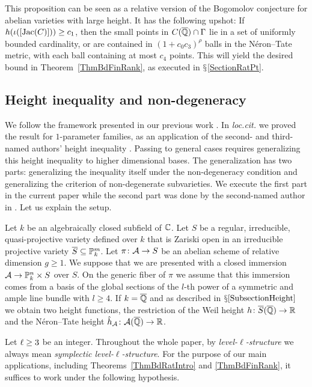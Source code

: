 This proposition can be seen as a relative version of the Bogomolov
conjecture for abelian varieties with large height. It has the
following upshot: If $h(\iota([\mathrm{Jac}(C)])) \ge c_1$, then the small
points in $C(\overline {{\mathbb{Q}}}) \cap \Gamma$ lie in a set of uniformly
bounded cardinality, or are contained in $(1+c_0c_3)^\rho$ balls in the
N\'eron--Tate metric, with each ball containing at most $c_4$ points.
This will yield the desired bound in Theorem~\ref{ThmBdFinRank}, as
executed in $\mathsection$\ref{SectionRatPt}.

\subsection{Height inequality and non-degeneracy}\label{subsec:hgtineqnondeg}
We follow the framework presented in our previous work \cite{DGH1p}.
In \textit{loc.cit.} we proved the result for $1$-parameter families,
as an application of the second- and third-named authors' height
inequality \cite[Theorem~1.4]{GaoHab}. Passing to general cases
requires generalizing this height inequality to higher dimensional
bases. The generalization has two parts:  generalizing the inequality
itself under the non-degeneracy condition and generalizing the
criterion of non-degenerate subvarieties.
We execute the first part in the current paper while the second part was 
done by the second-named author in \cite{GaoBettiRank}. Let us explain the setup.

Let $k$ be an algebraically closed subfield of ${\mathbb{C}}$. Let $S$ be a
regular, irreducible, quasi-projective variety defined over $k$ that
is Zariski open in an irreducible projective variety
$\overline S \subseteq{\mathbb{P}}_k^m$. Let $\pi \colon \mathcal{A} \rightarrow S$ be an
abelian scheme of relative dimension $g\ge 1$. We suppose that we are
presented with a closed immersion $\mathcal{A}\rightarrow{\mathbb{P}}_k^n\times S$ over
$S$. On the generic fiber of $\pi$ we assume that this immersion comes
from a basis of the global sections of the $l$-th power of a symmetric
and ample line bundle with $l\ge 4$. If $k={\overline{\mathbb{Q}}}$ and as described in
$\mathsection\ref{SubsectionHeight}$ we obtain two height functions,
the restriction of the Weil height
$h\colon \overline{S}({\overline{\mathbb{Q}}})\rightarrow {\mathbb{R}}$ and the N\'eron--Tate
height $\hat h_{\mathcal{A}} \colon \mathcal{A}({\overline{\mathbb{Q}}})\rightarrow {\mathbb{R}}$.

Let  $\ell\ge 3$ be an integer. Throughout the whole paper, by \textit{level-$\ell$-structure} we always mean \textit{symplectic level-$\ell$-structure}. For the purpose of our main applications, including
Theorems~\ref{ThmBdRatIntro} and \ref{ThmBdFinRank}, it suffices to
work under the following hypothesis. 

